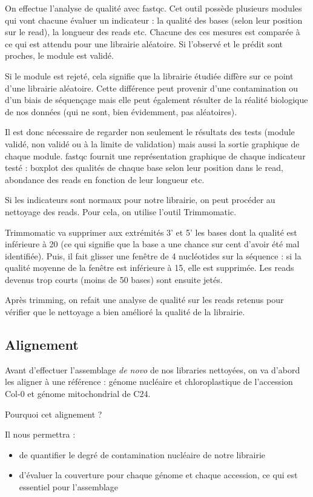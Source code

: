 \documentclass[a4paper]{article}
\begin{document}
On effectue l'analyse de qualité avec fastqc. Cet outil possède plusieurs modules qui vont chacune évaluer un indicateur : la qualité des bases (selon leur position sur le read), la longueur des reads etc. Chacune des ces mesures est comparée à ce qui est attendu pour une librairie aléatoire. Si l'observé et le prédit sont proches, le module est validé.

Si le module est rejeté, cela signifie que la librairie étudiée diffère sur ce point d'une librairie aléatoire. Cette différence peut provenir d'une contamination ou d'un biais de séquençage mais elle peut également résulter de la réalité biologique de nos données (qui ne sont, bien évidemment, pas aléatoires).

Il est donc nécessaire de regarder non seulement le résultats des tests (module validé, non validé ou à la limite de validation) mais aussi la sortie graphique de chaque module. fastqc fournit une représentation graphique de chaque indicateur testé : boxplot des qualités de chaque base selon leur position dans le read, abondance des reads en fonction de leur longueur etc. 

Si les indicateurs sont normaux pour notre librairie, on peut procéder au nettoyage des reads. Pour cela, on utilise l'outil Trimmomatic.

Trimmomatic va supprimer aux extrémités 3' et 5' les bases dont la qualité est inférieure à 20 (ce qui signifie que la base a une chance sur cent d'avoir été mal identifiée). Puis, il fait glisser une fenêtre de 4 nucléotides sur la séquence : si la qualité moyenne de la fenêtre est inférieure à 15, elle est supprimée. Les reads devenus trop courts (moins de 50 bases) sont ensuite jetés.

Après trimming, on refait une analyse de qualité sur les reads retenus pour vérifier que le nettoyage a bien amélioré la qualité de la librairie.

\subsection{Alignement}

Avant d'effectuer l'assemblage \textit{de novo} de nos libraries nettoyées, on va d'abord les aligner à une référence : génome nucléaire et chloroplastique de l'accession Col-0 et génome mitochondrial de C24. 

Pourquoi cet alignement ? 

Il nous permettra : 
\begin{itemize}
\item de quantifier le degré de contamination nucléaire de notre librairie

\item d'évaluer la couverture pour chaque génome et chaque accession, ce qui est essentiel pour l'assemblage

\end{itemize}
\end{document}
